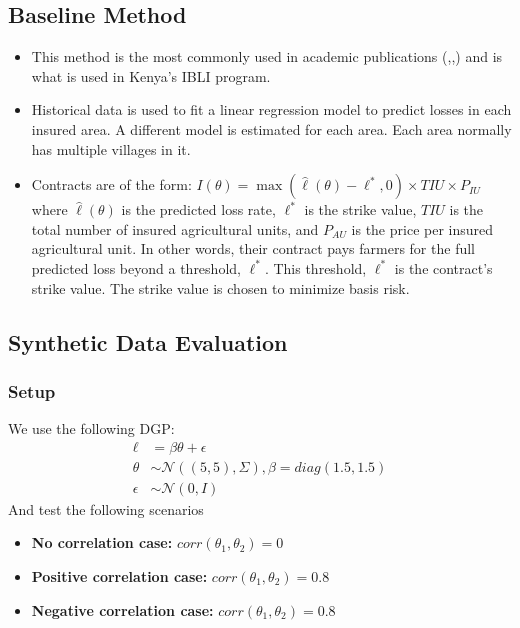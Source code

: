 \documentclass[11pt]{article}
\begin{document}
  \subsection{Baseline Method}\label{baseline}
    \begin{itemize}
        \item This method is the most commonly used in academic publications (\cite{chantarat2013designing},\cite{flatnes2018improving},\cite{jensen2019does}) and is what is used in Kenya's IBLI program. 
        \item Historical data is used to fit a linear regression model to predict losses in each insured area. A different model is estimated for each area. Each area normally has multiple villages in it. 
        \item Contracts are of the form: $I(\theta) = \max(\hat{\ell}(\theta)-\ell^*,0)\times TIU \times P_{IU}$ where $\hat{\ell}(\theta)$ is the predicted loss rate, $\ell^*$ is the strike value, $TIU$ is the total number of insured agricultural units, and $P_{AU}$ is the price per insured agricultural unit.  In other words, their contract pays farmers for the full predicted loss beyond a threshold, $\ell^*$. This threshold, $\ell^*$ is the contract's strike value. The strike value is chosen to minimize basis risk.
    \end{itemize}

  \subsection{Synthetic Data Evaluation}
    \subsubsection{Setup}
      We use the following DGP:
      \begin{align*}
        \ell &= \beta \theta + \epsilon\\
        \theta &\sim \mathcal{N}((5,5),\Sigma), \beta = diag(1.5,1.5)\\
        \epsilon &\sim \mathcal{N}(0,I)
      \end{align*}
      And test the following scenarios
      \begin{itemize}
          \item \textbf{No correlation case:} $corr(\theta_1,\theta_2) = 0$
          \item \textbf{Positive correlation case:} $corr(\theta_1,\theta_2) = 0.8$
          \item \textbf{Negative correlation case:} $corr(\theta_1,\theta_2) = 0.8$
      \end{itemize}
\end{document}

